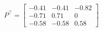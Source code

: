 \documentclass[preview]{standalone}
\begin{document}
\begin{align*}
P^\top=\left[\begin{matrix}-0.41&-0.41&-0.82\\-0.71&0.71&0\\-0.58&-0.58&0.58\end{matrix}\right]
\end{align*}
\end{document}
